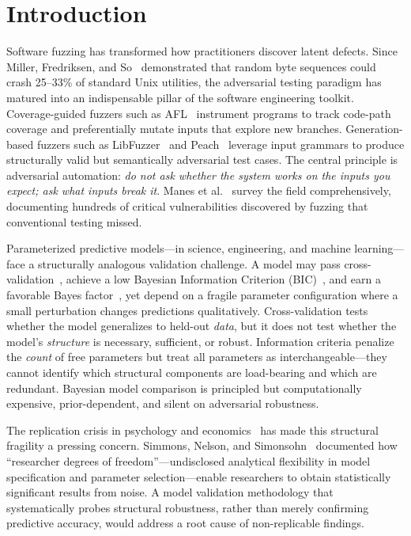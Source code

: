 \documentclass[manuscript,review,anonymous]{acmart}
\begin{document}
\maketitle

\section{Introduction}
\label{sec:intro}

Software fuzzing has transformed how practitioners discover latent defects.
Since Miller, Fredriksen, and So~\cite{miller1990} demonstrated that random byte sequences could crash 25--33\% of standard Unix utilities, the adversarial testing paradigm has matured into an indispensable pillar of the software engineering toolkit.
Coverage-guided fuzzers such as AFL~\cite{zalewski2014} instrument programs to track code-path coverage and preferentially mutate inputs that explore new branches.
Generation-based fuzzers such as LibFuzzer~\cite{serebryany2016} and Peach~\cite{eddington2009} leverage input grammars to produce structurally valid but semantically adversarial test cases.
The central principle is adversarial automation: \emph{do not ask whether the system works on the inputs you expect; ask what inputs break it}.
Manes et al.~\cite{manes2021} survey the field comprehensively, documenting hundreds of critical vulnerabilities discovered by fuzzing that conventional testing missed.

Parameterized predictive models---in science, engineering, and machine learning---face a structurally analogous validation challenge.
A model may pass cross-validation~\cite{stone1974}, achieve a low Bayesian Information Criterion (BIC)~\cite{schwarz1978}, and earn a favorable Bayes factor~\cite{kass1995}, yet depend on a fragile parameter configuration where a small perturbation changes predictions qualitatively.
Cross-validation tests whether the model generalizes to held-out \emph{data}, but it does not test whether the model's \emph{structure} is necessary, sufficient, or robust.
Information criteria penalize the \emph{count} of free parameters but treat all parameters as interchangeable---they cannot identify which structural components are load-bearing and which are redundant.
Bayesian model comparison is principled but computationally expensive, prior-dependent, and silent on adversarial robustness.

The replication crisis in psychology and economics~\cite{ioannidis2005,open2015} has made this structural fragility a pressing concern.
Simmons, Nelson, and Simonsohn~\cite{simmons2011} documented how ``researcher degrees of freedom''---undisclosed analytical flexibility in model specification and parameter selection---enable researchers to obtain statistically significant results from noise.
A model validation methodology that systematically probes structural robustness, rather than merely confirming predictive accuracy, would address a root cause of non-replicable findings.
\end{document}
